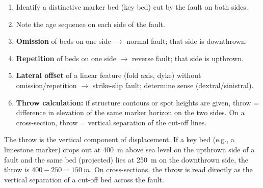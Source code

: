 \documentclass[11pt]{article}
\newcommand{\cle}[1]{{\popxbold\color{popdark}#1}}
\begin{document}
\begin{methode}
\begin{enumerate}
\item Identify a distinctive marker bed (key bed) cut by the fault on both sides.
\item Note the age sequence on each side of the fault.
\item \textbf{Omission} of beds on one side $\rightarrow$ normal fault; that side is downthrown.
\item \textbf{Repetition} of beds on one side $\rightarrow$ reverse fault; that side is upthrown.
\item \textbf{Lateral offset} of a linear feature (fold axis, dyke) without omission/repetition $\rightarrow$ strike-slip fault; determine sense (dextral/sinistral).
\item \textbf{Throw calculation:} if structure contours or spot heights are given, throw = difference in elevation of the same marker horizon on the two sides. On a cross-section, throw = vertical separation of the cut-off lines.
\end{enumerate}
\end{methode}

\begin{exemplebox}
The \cle{throw} is the vertical component of displacement. If a key bed (e.g., a limestone marker) crops out at \SI{400}{m} above sea level on the upthrown side of a fault and the same bed (projected) lies at \SI{250}{m} on the downthrown side, the throw is $400 - 250 = \SI{150}{m}$. On cross-sections, the throw is read directly as the vertical separation of a cut-off bed across the fault.
\end{exemplebox}
\end{document}
